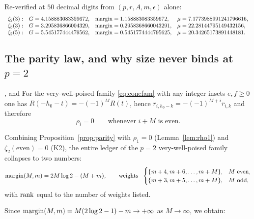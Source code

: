 Re-verified at $50$ decimal digits from $(p,r,A,m,\epsilon)$ alone:
{\footnotesize
\[
\begin{array}{llll}
 \zeta_2(3): & G=4.158883083359672, & \operatorname{margin}=1.158883083359672, & \mu=7.1773988991241796616,\\
 \zeta_3(3): & G=3.295836866004329, & \operatorname{margin}=0.2958368660043291, & \mu=22.28144795149432156,\\
 \zeta_2(5): & G=5.545177444479562, & \operatorname{margin}=0.5451774444795625, & \mu=20.34265173891448181 .
\end{array}
\]
}

\subsection{The parity law, and why size never binds at \texorpdfstring{$p=2$}{p=2}}
\label{ss:parity}

\begin{proposition}\label{prop:parity}
\PROVED{}, and  For the very-well-poised family
\eqref{eq:conefam} with any integer insets $e,f\ge0$ one has
$R(-h_0-t)=-(-1)^MR(t)$, hence $r_{i,h_0-k}=-(-1)^{M+i}r_{i,k}$ and therefore
\[
 \rho_i=0\qquad\text{whenever }i+M\text{ is even.}
\]
\end{proposition}

\begin{corollary}\label{cor:collapse}
\DERIVED{} Combining Proposition~\ref{prop:parity} with $\rho_1=0$
(Lemma~\ref{lem:rho1}) and $\zeta_2(\text{even})=0$ (K2), the entire ledger of the $p=2$
very-well-poised family collapses to two numbers:
\begin{equation}\label{eq:MMlaw}
 \marg(M,m)=2M\log2-(M+m),\qquad
 \text{weights }\ \begin{cases}\{m+4,m+6,\dots,m+M\}, & M\ \text{even},\\
                               \{m+3,m+5,\dots,m+M\}, & M\ \text{odd},\end{cases}
\end{equation}
with $\operatorname{rank}$ equal to the number of weights listed.
\end{corollary}

Since $\operatorname{margin}(M,m)=M(2\log2-1)-m\to+\infty$ as $M\to\infty$, we obtain:

